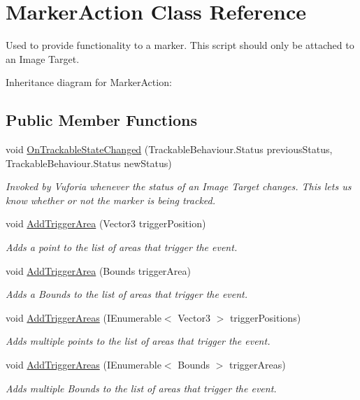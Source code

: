 \hypertarget{class_marker_action}{}\section{Marker\+Action Class Reference}
\label{class_marker_action}


Used to provide functionality to a marker. This script should only be attached to an Image Target.  


Inheritance diagram for Marker\+Action\+:\begin{figure}[H]
\begin{center}
\leavevmode
\end{center}
\end{figure}
\subsection*{Public Member Functions}
\begin{DoxyCompactItemize}
\item 
void \mbox{\hyperlink{class_marker_action_a28c986679a514fd744617cf0916e7662}{On\+Trackable\+State\+Changed}} (Trackable\+Behaviour.\+Status previous\+Status, Trackable\+Behaviour.\+Status new\+Status)
\begin{DoxyCompactList}\small\item\em Invoked by Vuforia whenever the status of an Image Target changes. This lets us know whether or not the marker is being tracked. \end{DoxyCompactList}\item 
void \mbox{\hyperlink{class_marker_action_a61235131a5158547a0ae7ddab7ef8c02}{Add\+Trigger\+Area}} (Vector3 trigger\+Position)
\begin{DoxyCompactList}\small\item\em Adds a point to the list of areas that trigger the event. \end{DoxyCompactList}\item 
void \mbox{\hyperlink{class_marker_action_ac27e22f8368b62f303cee146b800b40a}{Add\+Trigger\+Area}} (Bounds trigger\+Area)
\begin{DoxyCompactList}\small\item\em Adds a Bounds to the list of areas that trigger the event. \end{DoxyCompactList}\item 
void \mbox{\hyperlink{class_marker_action_a68156ef1048821f016d27211cf46422f}{Add\+Trigger\+Areas}} (I\+Enumerable$<$ Vector3 $>$ trigger\+Positions)
\begin{DoxyCompactList}\small\item\em Adds multiple points to the list of areas that trigger the event. \end{DoxyCompactList}\item 
void \mbox{\hyperlink{class_marker_action_aaec6622e06d2c62418117d1d4a4c1d70}{Add\+Trigger\+Areas}} (I\+Enumerable$<$ Bounds $>$ trigger\+Areas)
\begin{DoxyCompactList}\small\item\em Adds multiple Bounds to the list of areas that trigger the event. \end{DoxyCompactList}\end{DoxyCompactItemize}
